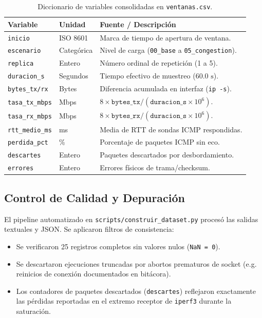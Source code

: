 \documentclass[10pt,twocolumn,letterpaper]{article}
\begin{document}
\begin{table}[htbp]
\centering
\small
\caption{Diccionario de variables consolidadas en \texttt{ventanas.csv}.}
\label{tab:variables}
\begin{tabularx}{\linewidth}{l l X}
\toprule
\textbf{Variable} & \textbf{Unidad} & \textbf{Fuente / Descripción} \\
\midrule
\texttt{inicio} & ISO 8601 & Marca de tiempo de apertura de ventana. \\
\texttt{escenario} & Categórica & Nivel de carga (\texttt{00\_base} a \texttt{05\_congestion}). \\
\texttt{replica} & Entero & Número ordinal de repetición (1 a 5). \\
\texttt{duracion\_s} & Segundos & Tiempo efectivo de muestreo ($60.0\text{ s}$). \\
\texttt{bytes\_tx/rx} & Bytes & Diferencia acumulada en interfaz (\texttt{ip -s}). \\
\texttt{tasa\_tx\_mbps} & Mbps & $8 \times \texttt{bytes\_tx} / (\texttt{duracion\_s} \times 10^6)$. \\
\texttt{tasa\_rx\_mbps} & Mbps & $8 \times \texttt{bytes\_rx} / (\texttt{duracion\_s} \times 10^6)$. \\
\texttt{rtt\_medio\_ms} & ms & Media de RTT de sondas ICMP respondidas. \\
\texttt{perdida\_pct} & \% & Porcentaje de paquetes ICMP sin eco. \\
\texttt{descartes} & Entero & Paquetes descartados por desbordamiento. \\
\texttt{errores} & Entero & Errores físicos de trama/checksum. \\
\bottomrule
\end{tabularx}
\end{table}

\subsection{Control de Calidad y Depuración}
El pipeline automatizado en \texttt{scripts/construir\_dataset.py} procesó las salidas textuales y JSON. Se aplicaron filtros de consistencia:
\begin{itemize}
    \item Se verificaron 25 registros completos sin valores nulos (\texttt{NaN = 0}).
    \item Se descartaron ejecuciones truncadas por abortos prematuros de socket (e.g. reinicios de conexión documentados en bitácora).
    \item Los contadores de paquetes descartados (\texttt{descartes}) reflejaron exactamente las pérdidas reportadas en el extremo receptor de \texttt{iperf3} durante la saturación.
\end{itemize}
\end{document}
